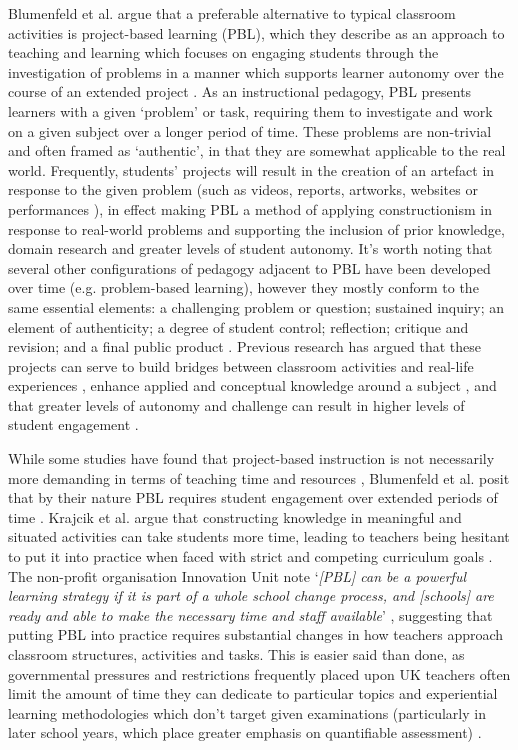 Blumenfeld et al. argue that a preferable alternative to typical classroom activities is project-based learning (PBL), which they describe as an approach to teaching and learning which focuses on engaging students through the investigation of problems in a manner which supports learner autonomy over the course of an extended project \citep{Blumenfeld1991}. As an instructional pedagogy, PBL presents learners with a given `problem' or task, requiring them to investigate and work on a given subject over a longer period of time. These problems are non-trivial and often framed as `authentic', in that they are somewhat applicable to the real world. Frequently, students' projects will result in the creation of an artefact in response to the given problem (such as videos, reports, artworks, websites or performances \citep{Holubova2008}), in effect making PBL a method of applying constructionism in response to real-world problems and supporting the inclusion of prior knowledge, domain research and greater levels of student autonomy. It's worth noting that several other configurations of pedagogy adjacent to PBL have been developed over time (e.g. problem-based learning), however they mostly conform to the same essential elements: a challenging problem or question; sustained inquiry; an element of authenticity; a degree of student control; reflection; critique and revision; and a final public product \citep{Larmer2015}. Previous research has argued that these projects can serve to build bridges between classroom activities and real-life experiences \citep{Blumenfeld1991}, enhance applied and conceptual knowledge around a subject \citep{Boaler1999}, and that greater levels of autonomy and challenge can result in higher levels of student engagement \citep{Wurdinger2007}.

While some studies have found that project-based instruction is not necessarily more demanding in terms of teaching time and resources \citep{Al-Balushi2014}, Blumenfeld et al. posit that by their nature PBL requires student engagement over extended periods of time \citep{Blumenfeld1991}. Krajcik et al. argue that constructing knowledge in meaningful and situated activities can take students more time, leading to teachers being hesitant to put it into practice when faced with strict and competing curriculum goals \citep{Krajcik2006}. The non-profit organisation Innovation Unit note `\textit{[PBL] can be a powerful learning strategy if it is part of a whole school change process, and [schools] are ready and able to make the necessary time and staff available}' \citep{InnovationUnit2016}, suggesting that putting PBL into practice requires substantial changes in how teachers approach classroom structures, activities and tasks. This is easier said than done, as governmental pressures and restrictions frequently placed upon UK teachers often limit the amount of time they can dedicate to particular topics and experiential learning methodologies which don't target given examinations (particularly in later school years, which place greater emphasis on quantifiable assessment) \citep{Ofsted2018}.

